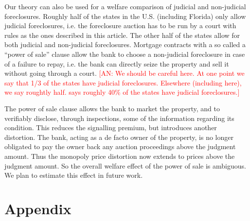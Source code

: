 \documentclass[11pt,twopage]{article}
\newcommand{\AN}[1]{\textcolor{red}{[AN: #1]}}
\begin{document}
Our theory can also be used for a welfare comparison of judicial and non-judicial foreclosures. 
Roughly half of the states in the
U.S. (including Florida) only allow judicial foreclosures, i.e. the
foreclosure auction has to be run by a court with rules as the ones
described in this article. The other half of the states allow for both
judicial and non-judicial foreclosures.  Mortgage contracts
with a so called a ``power of sale'' clause allow the bank to choose a non-judicial
foreclosure in case of a failure to repay, i.e. the bank can directly
seize the property and sell it without going through a court. \AN{We should be careful here. At one point we say that 1/3 of the states have judicial foreclosures. Elsewhere (including here), we say roughtly half. \cite{nelson2004reforming} says roughly 40\% of the states have judicial foreclosures.} 

The power of sale clause allows the bank to market the property, and to verifiably disclose, through inspections, some of the information regarding its condition. This reduces the signalling premium, but introduces another distortion. The bank, acting as a de facto owner of the property, is no longer obligated to pay the owner back any auction proceedings above the judgment amount. Thus the monopoly price distortion now extends to prices above the judgment amount. So the overall welfare effect of the power of sale is ambiguous. We plan to estimate this effect in future work.


%
%
%

\appendix
\section*{Appendix}
\end{document}
